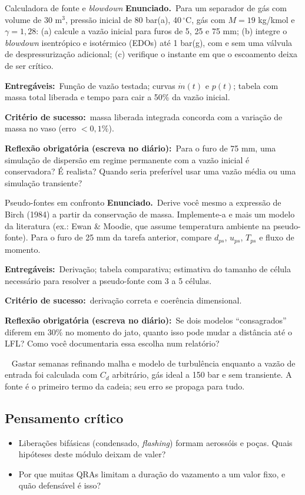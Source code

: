 \documentclass[10pt,a4paper,twocolumn,openany]{report}
\newcommand{\lead}[2]{\par\medskip\noindent{\color{#1}\bfseries #2}\ }
\newenvironment{armadilha}{\lead{vermelho}{Armadilha clássica.}}{\par\medskip}
\newenvironment{critico}{\subsection*{\textcolor{roxo}{Pensamento crítico}}}{\par}
\newcommand{\enunciado}{\noindent\textbf{Enunciado.}\ }
\newcommand{\entregaveis}{\par\medskip\noindent\textbf{Entregáveis:}}
\newcommand{\criterio}{\par\medskip\noindent\textbf{Critério de sucesso:}\ }
\newcommand{\reflexao}{\par\medskip\noindent\textbf{Reflexão obrigatória (escreva no diário):}}
\begin{document}
\begin{tarefa}{Calculadora de fonte e \emph{blowdown}}
\enunciado Para um separador de gás com volume de 30 m$^3$, pressão inicial
de 80 bar(a), 40\,$^\circ$C, gás com $M=19$ kg/kmol e $\gamma=1{,}28$:
(a) calcule a vazão inicial para furos de 5, 25 e 75 mm; (b) integre o
\emph{blowdown} isentrópico e isotérmico (EDOs) até 1 bar(g), com e sem uma
válvula de despressurização adicional; (c) verifique o instante em que o
escoamento deixa de ser crítico.
\entregaveis\ Função de vazão testada; curvas $\dot m(t)$ e $p(t)$; tabela
com massa total liberada e tempo para cair a 50\% da vazão inicial.
\criterio massa liberada integrada concorda com a variação de massa
no vaso (erro $<0{,}1\%$).
\reflexao\ Para o furo de 75 mm, uma simulação de dispersão em regime
permanente com a vazão inicial é conservadora? É realista? Quando seria
preferível usar uma vazão média ou uma simulação transiente?
\end{tarefa}

\begin{tarefa}{Pseudo-fontes em confronto}
\enunciado Derive você mesmo a expressão de Birch (1984) a partir da
conservação de massa. Implemente-a e mais um modelo da literatura (ex.: Ewan
\& Moodie, que assume temperatura ambiente na pseudo-fonte). Para o furo de
25 mm da tarefa anterior, compare $d_{ps}$, $u_{ps}$, $T_{ps}$ e fluxo de
momento.
\entregaveis\ Derivação; tabela comparativa; estimativa do tamanho de célula
necessário para resolver a pseudo-fonte com 3 a 5 células.
\criterio derivação correta e coerência dimensional.
\reflexao\ Se dois modelos ``consagrados'' diferem em 30\% no momento do
jato, quanto isso pode mudar a distância até o LFL? Como você documentaria
essa escolha num relatório?
\end{tarefa}

\begin{armadilha}
Gastar semanas refinando malha e modelo de turbulência enquanto a vazão
de entrada foi calculada com $C_d$ arbitrário, gás ideal a 150 bar e sem
transiente. A fonte é o primeiro termo da cadeia; seu erro se propaga
para tudo.
\end{armadilha}

\begin{critico}
\begin{itemize}
  \item Liberações bifásicas (condensado, \emph{flashing}) formam aerossóis
        e poças. Quais hipóteses deste módulo deixam de valer?
  \item Por que muitas QRAs limitam a duração do vazamento a um valor fixo,
        e quão defensável é isso?
\end{itemize}
\end{critico}
\end{document}
